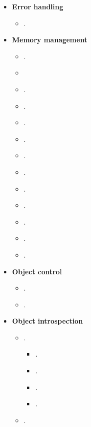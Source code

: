   \begin{itemize}
  {}\item\textbf{Error handling}
    \begin{itemize}
    {}\item\GCGTestForException.
    \end{itemize}
  {}\item\textbf{Memory management}
    \begin{itemize}
    {}\item\GCGAvoidRawPointers.
    {}\item\GCGUseStdString
    {}\item\GCGTeuchosPtr.
    {}\item\GCGTeuchosRCP.
    {}\item\GCGNonmemberConstructors.
    {}\item\GCGGeneralizedViews.
    {}\item\GCGTeuchosArrayView.
    {}\item\GCGTeuchosArray.
    {}\item\GCGTeuchosArrayRCP.
    {}\item\GCGReturnSmartPointersByValue.
    {}\item\GCGRawReferencesNonPersisting.
    {}\item\GCGSemiPersisting.
    {}\item\GCGPostponeRawPointers.
    \end{itemize}
  {}\item\textbf{Object control}
    \begin{itemize}
    {}\item\GCGTeuchosParamterListAcceptor.
    {}\item\GCGTeuchosParamterListValidation.
    \end{itemize}
  {}\item\textbf{Object introspection}
    \begin{itemize}
    {}\item\GCGStdStream.
      \begin{itemize}
      {}\item\GCGTeuchosFancyOStream.
      {}\item\GCGTeuchosDescribable.
      {}\item\GCGTeuchosVerboseObject.
      {}\item\GCGTeuchosVerboseObjectBaseDefaultOStream.
      \end{itemize}
    {}\item\GCGTeuchosTimers.
    \end{itemize}

\end{itemize}
